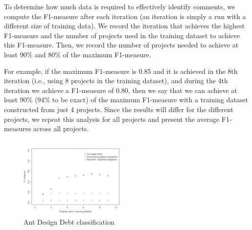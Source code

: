 

To determine how much data is required to effectively identify \SATD comments, we compute the F1-measure after each iteration (an iteration is simply a run with a different size of training data). We record the iteration that achieves the highest F1-measure and the number of projects used in the training dataset to achieve this F1-measure. Then, we record the number of projects needed to achieve at least 90\% and 80\% of the maximum F1-measure.

For example, if the maximum F1-measure is 0.85 and it is achieved in the 8th iteration (i.e., using 8 projects in the training dataset), and during the 4th iteration we achieve a F1-measure of 0.80, then we say that we can achieve at least 90\% (94\% to be exact) of the maximum F1-measure with a training dataset constructed from just 4 projects. Since the results will differ for the different projects, we repeat this analysis for all projects and present the average F1-measures across all projects.

\begin{figure}[t]
  \centering
  \includegraphics[width = 0.48\textwidth]{figures/design_ant.pdf}
  \vspace{-3mm}
  \caption{Ant Design Debt classification}
  \label{fig:design_ant_result}
\end{figure}

